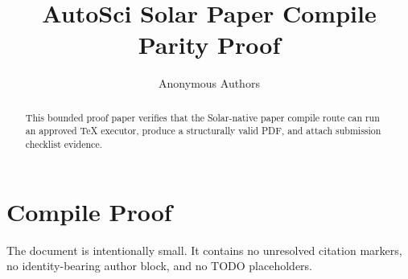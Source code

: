 \documentclass[11pt]{article}
\author{Anonymous Authors}
\title{AutoSci Solar Paper Compile Parity Proof}
\begin{document}
\maketitle
\begin{abstract}
This bounded proof paper verifies that the Solar-native paper compile route can run an approved TeX executor, produce a structurally valid PDF, and attach submission checklist evidence.
\end{abstract}
\section{Compile Proof}
The document is intentionally small. It contains no unresolved citation markers, no identity-bearing author block, and no TODO placeholders.
\end{document}
